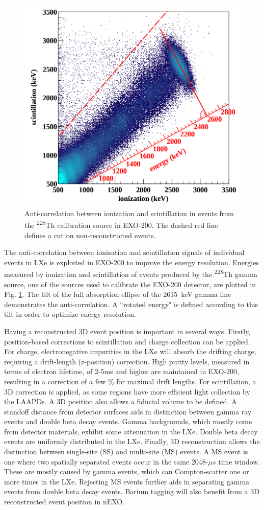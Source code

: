 \begin{figure} %
	\centering
	\includegraphics[width=.5\textwidth]{figures/anticorr.png}
	\caption{Anti-correlation between ionization and scintillation in events from the \textsuperscript{228}Th calibration source in EXO-200.  The dashed red line defines a cut on non-reconstructed events. \cite{EXO2000nuOriginal}}
\label{fig:antiCorr}
\end{figure}

The anti-correlation between ionization and scintillation signals of individual events in LXe \cite{anticorr} is exploited in EXO-200 to improve the energy resolution.  Energies measured by ionization and scintillation of events produced by the \textsuperscript{228}Th gamma source, one of the sources used to calibrate the EXO-200 detector, are plotted in Fig. \ref{fig:antiCorr}.  The tilt of the full absorption ellipse of the 2615~keV gamma line demonstrates the anti-correlation.  A ``rotated energy" is defined according to this tilt in order to optimize energy resolution.


Having a reconstructed 3D event position is important in several ways.  Firstly, position-based corrections to scintillation and charge collection can be applied.  For charge, electronegative impurities in the LXe will absorb the drifting charge, requiring a drift-length (z-position) correction.  High purity levels, measured in terms of electron lifetime, of 2-5ms and higher are maintained in EXO-200, resulting in a correction of a few \% for maximal drift lengths.  For scintillation, a 3D correction is applied, as some regions have more efficient light collection by the LAAPDs.  A 3D position also allows a fiducial volume to be defined.  A standoff distance from detector surfaces aids in distinction between gamma ray events and double beta decay events.  Gamma backgrounds, which mostly come from detector materials, exhibit some attenuation in the LXe.  Double beta decay events are uniformly distributed in the LXe.  Finally, 3D reconstruction allows the distinction between single-site (SS) and multi-site (MS) events.  A MS event is one where two spatially separated events occur in the same 2048-$\mu s$ time window.  These are mostly caused by gamma events, which can Compton-scatter one or more times in the LXe.  Rejecting MS events further aids in separating gamma events from double beta decay events.  \cite{EXO200TwoNuLong} Barium tagging will also benefit from a 3D reconstructed event position in nEXO.

